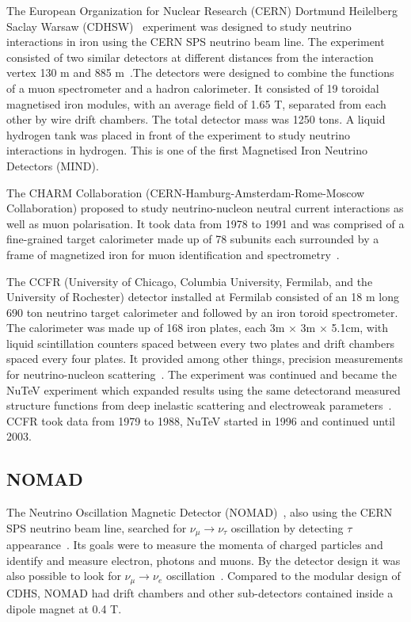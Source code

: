 The European Organization for Nuclear Research (CERN) Dortmund Heilelberg Saclay Warsaw (CDHSW)~\cite{40CDHSW} experiment was designed to study neutrino interactions in iron using the CERN SPS neutrino beam line. The experiment consisted of two similar detectors at different distances from the interaction vertex 130 m and 885 m~\cite{40CDHSW}.The detectors were designed to combine the functions of a muon spectrometer and a hadron calorimeter. It consisted of 19 toroidal magnetised iron modules, with an average field of 1.65 T, separated from each other by wire drift chambers. The total detector mass was 1250 tons. A liquid hydrogen tank was placed in front of the experiment to study neutrino interactions in hydrogen. This is one of the first Magnetised Iron Neutrino Detectors (MIND).

The CHARM Collaboration (CERN-Hamburg-Amsterdam-Rome-Moscow Collaboration) proposed to study neutrino-nucleon neutral current interactions as well as muon polarisation. It took data from 1978 to 1991 and  was comprised of a fine-grained target calorimeter made up of 78 subunits each surrounded by a frame of magnetized iron for muon identification and spectrometry~\cite{68CHARM}.

The CCFR (University of Chicago, Columbia University, Fermilab, and the University of Rochester) detector installed at Fermilab consisted of an 18 m long 690 ton neutrino target calorimeter and followed by an iron toroid spectrometer. The calorimeter was made up of 168 iron plates, each 3m $\times$ 3m $\times$ 5.1cm, with liquid scintillation counters spaced between every two plates and drift chambers spaced every four plates. It provided among other things, precision measurements for neutrino-nucleon scattering~\cite{67CCFR}. The experiment was continued and became the NuTeV experiment which expanded results using the same detectorand measured structure functions from deep inelastic scattering and electroweak parameters~\cite{99Yang, 100Zeller}. CCFR took data from 1979 to 1988, NuTeV started in 1996 and continued until 2003.

\subsection{NOMAD}
The Neutrino Oscillation Magnetic Detector (NOMAD)~\cite{NOMADexp}, also using the CERN SPS neutrino beam line, searched for $\nu_\mu \rightarrow \nu_\tau$ oscillation by detecting $\tau$ appearance~\cite{101Astierj}. Its goals were to measure the momenta of charged particles and identify and measure electron, photons and muons. By the detector design it was also possible to look for $\nu_\mu \rightarrow \nu_e$ oscillation~\cite{102Astier}. Compared to the modular design of CDHS, NOMAD had drift chambers and other sub-detectors contained inside a dipole magnet at 0.4 T.


